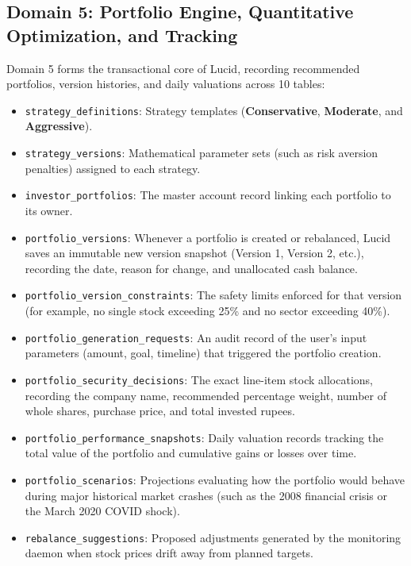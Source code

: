 \clearpage
\subsection{Domain 5: Portfolio Engine, Quantitative Optimization, and Tracking}
Domain 5 forms the transactional core of Lucid, recording recommended portfolios, version histories, and daily valuations across 10 tables:
\begin{itemize}
    \item \texttt{strategy\_definitions}: Strategy templates (\textbf{Conservative}, \textbf{Moderate}, and \textbf{Aggressive}).
    \item \texttt{strategy\_versions}: Mathematical parameter sets (such as risk aversion penalties) assigned to each strategy.
    \item \texttt{investor\_portfolios}: The master account record linking each portfolio to its owner.
    \item \texttt{portfolio\_versions}: Whenever a portfolio is created or rebalanced, Lucid saves an immutable new version snapshot (Version 1, Version 2, etc.), recording the date, reason for change, and unallocated cash balance.
    \item \texttt{portfolio\_version\_constraints}: The safety limits enforced for that version (for example, no single stock exceeding 25\% and no sector exceeding 40\%).
    \item \texttt{portfolio\_generation\_requests}: An audit record of the user's input parameters (amount, goal, timeline) that triggered the portfolio creation.
    \item \texttt{portfolio\_security\_decisions}: The exact line-item stock allocations, recording the company name, recommended percentage weight, number of whole shares, purchase price, and total invested rupees.
    \item \texttt{portfolio\_performance\_snapshots}: Daily valuation records tracking the total value of the portfolio and cumulative gains or losses over time.
    \item \texttt{portfolio\_scenarios}: Projections evaluating how the portfolio would behave during major historical market crashes (such as the 2008 financial crisis or the March 2020 COVID shock).
    \item \texttt{rebalance\_suggestions}: Proposed adjustments generated by the monitoring daemon when stock prices drift away from planned targets.
\end{itemize}

